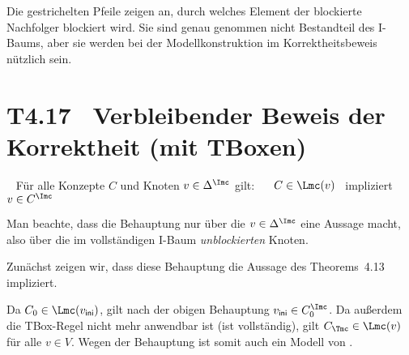 \documentclass[fontsize=11pt, twoside=false, numbers=autoenddot]{scrbook}
\begin{document}
Die gestrichelten Pfeile zeigen an, durch welches Element der blockierte Nachfolger
blockiert wird.
Sie sind genau genommen nicht Bestandteil des I-Baums, aber sie werden
bei der Modellkonstruktion im Korrektheitsbeweis nützlich sein.

\section*{T4.17~ Verbleibender Beweis der Korrektheit (mit TBoxen)}

~
Für alle Konzepte $C$ und Knoten $v \in \Delta^\Imc$ gilt:
~~
$C \in \Lmc(v)$
~impliziert~
$v \in C^\Imc$

\parII
Man beachte, dass die Behauptung nur über die $v \in \Delta^\Imc$
eine Aussage macht, also über die im vollständigen I-Baum \Bmc \emph{unblockierten} Knoten.

\par\medskip
Zunächst zeigen wir, dass diese Behauptung die Aussage
des Theorems~4.13 impliziert.

Da $C_0 \in \Lmc(v_{\textsf{ini}})$,
gilt nach der obigen Behauptung $v_{\textsf{ini}} \in C_0^\Imc$.
Da außerdem die TBox-Regel nicht mehr anwendbar ist (\Bmc ist vollständig),
gilt $C_\Tmc \in \Lmc(v)$ für alle $v \in V$.
Wegen der Behauptung ist somit \Imc auch ein Modell von \Tmc.
\end{document}
